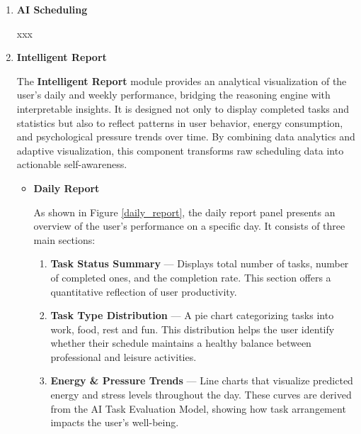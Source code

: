 \documentclass[12pt, a4paper]{article}
\begin{document}
\begin{enumerate}
                \item \textbf{AI Scheduling}

                    xxx

                \item \textbf{Intelligent Report}
                                
                    The \textbf{Intelligent Report} module provides an analytical visualization of the user’s daily and weekly performance, bridging the reasoning engine with interpretable insights. It is designed not only to display completed tasks and statistics but also to reflect patterns in user behavior, energy consumption, and psychological pressure trends over time. By combining data analytics and adaptive visualization, this component transforms raw scheduling data into actionable self-awareness.
    
                    \begin{itemize}
                        \item \textbf{Daily Report}
    
                            As shown in Figure \ref{daily_report}, the daily report panel presents an overview of the user's performance on a specific day. It consists of three main sections:
                        
                            \begin{enumerate}
                                \item \textbf{Task Status Summary} — Displays total number of tasks, number of completed ones, and the completion rate. This section offers a quantitative reflection of user productivity.
                                \item \textbf{Task Type Distribution} — A pie chart categorizing tasks into work, food, rest and fun. This distribution helps the user identify whether their schedule maintains a healthy balance between professional and leisure activities.
                                \item \textbf{Energy \& Pressure Trends} — Line charts that visualize predicted energy and stress levels throughout the day. These curves are derived from the AI Task Evaluation Model, showing how task arrangement impacts the user’s well-being.
                            \end{enumerate}
            

\end{itemize}
\end{enumerate}
\end{document}
